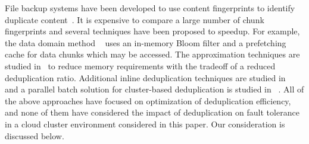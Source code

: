 File backup systems have been developed to use content fingerprints to identify duplicate
content~\cite{venti02,Rhea2008}.  It is expensive to compare a large number of chunk fingerprints
and several techniques have been proposed to speedup. For example, the data domain method ~\cite{bottleneck08} 
uses  an in-memory Bloom filter and a prefetching cache for data chunks  which may be
accessed.  
The approximation techniques are studied in~\cite{extreme_binning09,Guo2011,WeiZhangIEEE}  
to reduce memory requirements with the tradeoff of a reduced deduplication ratio.
Additional inline deduplication techniques are studied in ~\cite{sparseindex09,Guo2011,Srinivasan2012}
and a parallel batch solution for cluster-based deduplication is 
studied in ~\cite{wei2013}. 
All of the above approaches have focused on optimization of deduplication
efficiency, and none of them have considered the impact
of deduplication on fault tolerance in a cloud  cluster environment considered in this paper.
Our consideration is discussed below.
